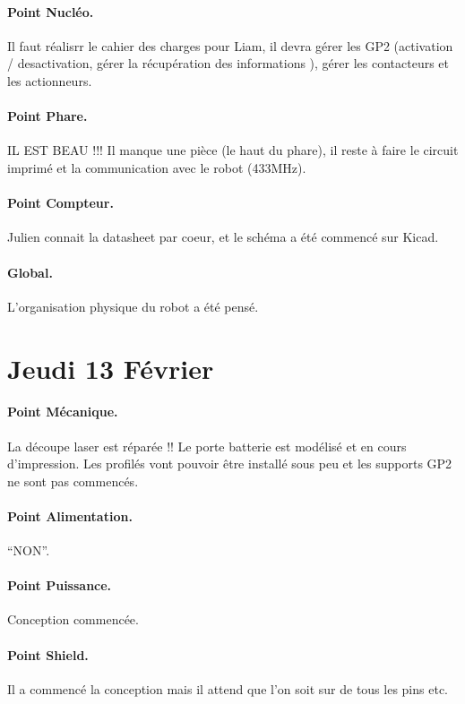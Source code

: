 \documentclass[a4paper,10pt]{report}
\begin{document}
\begin{spacing}{1.5}
\paragraph{Point Nucléo.} Il faut réalisrr le cahier des charges pour Liam, il devra
gérer les GP2 (activation / desactivation, gérer la récupération des informations
), gérer les contacteurs et les actionneurs.
\paragraph{Point Phare.} IL EST BEAU !!! Il manque une pièce (le haut du phare),
il reste à faire le circuit imprimé et la communication avec le robot (433MHz).
\paragraph{Point Compteur.} Julien connait la datasheet par coeur, et le schéma
a été commencé sur Kicad.
\paragraph{Global.} L'organisation physique du robot a été pensé.

\section*{Jeudi 13 Février}
\paragraph{Point Mécanique.} La découpe laser est réparée !! Le porte batterie
est modélisé et en cours d'impression. Les profilés vont pouvoir être installé
sous peu et les supports GP2 ne sont pas commencés. \\

\paragraph{Point Alimentation.} ``NON''.

\paragraph{Point Puissance.} Conception commencée.

\paragraph{Point Shield.} Il a commencé la conception mais il attend que l'on soit sur
de tous les pins etc.


\end{spacing}
\end{document}
